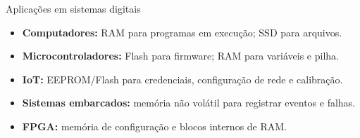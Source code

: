 \begin{frame}[t]{Aplicações em sistemas digitais}
  \begin{itemize}
    \item \textbf{Computadores:} RAM para programas em execução; SSD para arquivos.
    \item \textbf{Microcontroladores:} Flash para firmware; RAM para variáveis e pilha.
    \item \textbf{IoT:} EEPROM/Flash para credenciais, configuração de rede e calibração.
    \item \textbf{Sistemas embarcados:} memória não volátil para registrar eventos e falhas.
    \item \textbf{FPGA:} memória de configuração e blocos internos de RAM.
  \end{itemize}
\end{frame}
